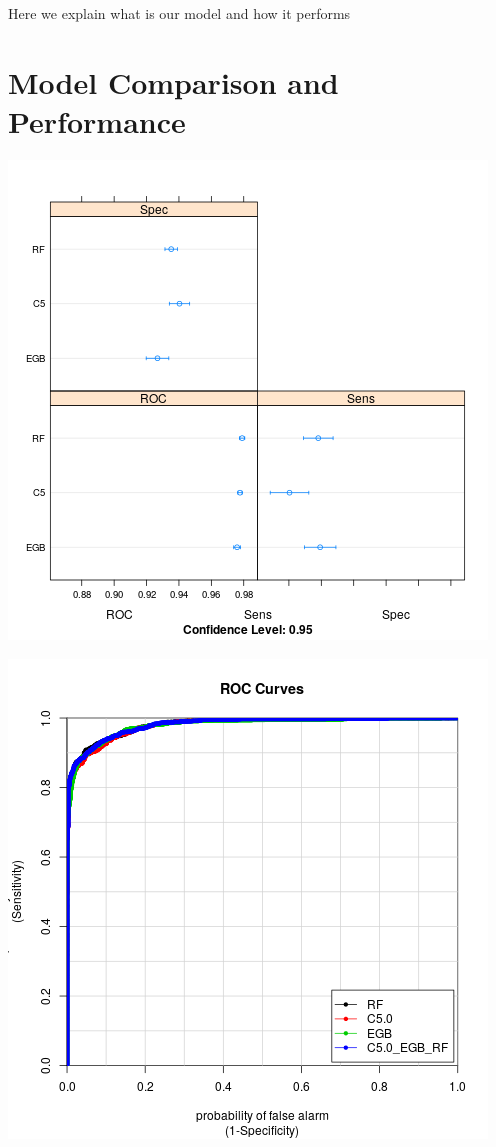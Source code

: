 \documentclass[12pt,a4paper,leqno]{report}
\theoremstyle{plain}
\theoremstyle{definition}
\theoremstyle{remark}
\begin{document}
Here we explain what is our model and how it performs


\section{Model Comparison and Performance}


\bigskip
{
    \centering
    \includegraphics[width=\textwidth,height=\textheight,keepaspectratio]{dotplot_comparison.png}
    \par
}
\bigskip

\bigskip
{
    \centering
    \includegraphics[width=\textwidth,height=\textheight,keepaspectratio]{AUC_comparison.png}
    \par
}
\bigskip
\end{document}
